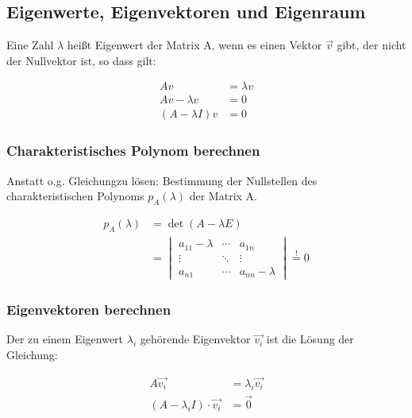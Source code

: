 
\subsection{Eigenwerte, Eigenvektoren und Eigenraum}

Eine Zahl \(\lambda\) heißt Eigenwert der Matrix A, wenn es einen Vektor \(\vec{v}\) gibt, der nicht der Nullvektor ist, so dass gilt:

\begin{equation*}
    \begin{split}
        A v &= \lambda v \\
        A v - \lambda v &= 0 \\
        (A - \lambda I) v &= 0
    \end{split}
\end{equation*}


\subsubsection{Charakteristisches Polynom berechnen}
\label{sec:charPolynom}
Anstatt o.g. Gleichungzu lösen: Bestimmung der Nullstellen des charakteristischen Polynoms \(p_A(\lambda)\) der Matrix A.

\begin{equation*}
    \begin{split}
    p_A(\lambda) & = \det(A - \lambda E) \\
    & = \begin{vmatrix}
    a_{11} - \lambda & \cdots & a_{1n} \\
    \vdots & \ddots & \vdots \\
    a_{n1} & \cdots & a_{nn} - \lambda
    \end{vmatrix} \overset{!}{=} 0
    \end{split}
\end{equation*}

\subsubsection{Eigenvektoren berechnen}
Der zu einem Eigenwert \(\lambda_i\) gehörende Eigenvektor \(\vec{v_i}\) ist die Lösung der Gleichung:

\begin{equation*}
    \begin{split}
        A\vec{v_i} &= \lambda_i \vec{v_i} \\
        (A - \lambda_i I) \cdot \vec{v_i} &= \vec{0}
    \end{split}
\end{equation*}


